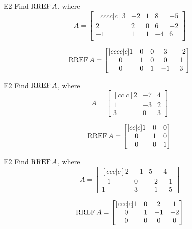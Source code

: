 \begin{problem}{E2}
Find \(\operatorname{RREF} A\), where
\[
  A =
  \begin{bmatrix}[cccc|c]
    3 & -2 & 1 & 8 & -5 \\
    2 & 2 & 0 & 6 & -2 \\
    -1 & 1 & 1 & -4 & 6 \\
  \end{bmatrix}
\]
\end{problem}
\begin{solution}
\[
  \operatorname{RREF} A =
  \begin{bmatrix}[cccc|c]
    1 & 0 & 0 & 3 & -2 \\
    0 & 1 & 0 & 0 & 1 \\
    0 & 0 & 1 & -1 & 3
  \end{bmatrix}
\]
\end{solution}

\begin{problem}{E2}
Find \(\operatorname{RREF} A\), where
\[
  A =
  \begin{bmatrix}[cc|c]
    2 & -7 & 4 \\
    1 & -3 & 2 \\
    3 & 0 & 3
  \end{bmatrix}
\]
\end{problem}
\begin{solution}
\[
  \operatorname{RREF} A =
  \begin{bmatrix}[cc|c]
    1 & 0 & 0 \\
    0 & 1 & 0 \\
    0 & 0 & 1
  \end{bmatrix}
\]
\end{solution}

\begin{problem}{E2}
Find \(\operatorname{RREF} A\), where
\[
  A =
  \begin{bmatrix}[ccc|c]
    2 & -1 & 5 & 4 \\
    -1 & 0 & -2 & -1 \\
    1 & 3 & -1 & -5
  \end{bmatrix}
\]
\end{problem}
\begin{solution}
\[
  \operatorname{RREF} A =
  \begin{bmatrix}[ccc|c]
    1 & 0 & 2 & 1 \\
    0 & 1 & -1 & -2 \\
    0 & 0 & 0 & 0
  \end{bmatrix}
\]
\end{solution}


